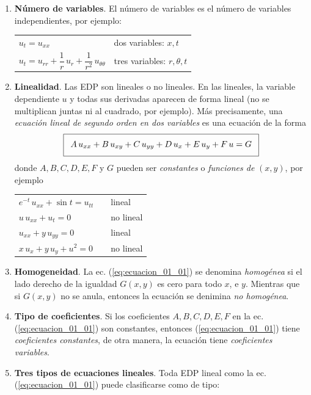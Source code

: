 \begin{enumerate}
\item \textbf{Número de variables}. El número de variables es el número de variables independientes, por ejemplo:
\begin{table}[H]
\centering
\large
\begin{tabular}{l l}
\large{$u_{t} = u_{xx}$} & dos variables: $x, t$ \\
\large{$u_{t} = u_{rr} + \dfrac{1}{r} \, u_{r} + \dfrac{1}{r^{2}} \, u_{\theta \theta}$} & tres variables: $r, \theta, t$
\end{tabular}
\end{table}
\item \textbf{Linealidad}. Las EDP son lineales o no lineales. En las lineales, la variable dependiente $u$ y todas sus derivadas aparecen de forma lineal (no se multiplican juntas ni al cuadrado, por ejemplo). Más precisamente, una \emph{ecuación lineal de segundo orden en dos variables} es una ecuación de la forma
\begin{align}
\addtolength{\fboxsep}{5pt}\boxed{ A \, u_{xx} + B \, u_{xy} + C \, u_{yy} + D \, u_{x} + E \, u_{y} + F \, u = G}
\label{eq:ecuacion_01_01}
\end{align}
donde $A, B, C, D, E, F$ y $G$ pueden ser \emph{constantes} o \emph{funciones de} $(x, y)$, por ejemplo
\begin{table}[H]
\centering
\large
\begin{tabular}{l p{1cm} l}
\large{$e^{-t} \, u_{xx} + \sin t = u_{tt}$} & & lineal \\
\large{$u \, u_{xx} + u_{t} = 0$} & & no lineal \\
\large{$u_{xx} + y \, u_{yy} = 0$} & & lineal \\
\large{$x \, u_{x} + y \, u_{y} + u^{2} = 0$} & & no lineal
\end{tabular}
\end{table}
\item \textbf{Homogeneidad}. La ec. (\ref{eq:ecuacion_01_01}) se denomina \emph{homogénea} si el lado derecho de la igualdad $G(x, y)$ es cero para todo $x$, e $y$. Mientras que si $G(x, y)$ no se anula, entonces la ecuación se denimina \emph{no homogénea}.
\item \textbf{Tipo de coeficientes}. Si los coeficientes $A, B, C, D, E, F$ en la ec. (\ref{eq:ecuacion_01_01}) son constantes, entonces (\ref{eq:ecuacion_01_01}) tiene \emph{coeficientes constantes}, de otra manera, la ecuación tiene \emph{coeficientes variables}.
\item \textbf{Tres tipos de ecuaciones lineales}. Toda EDP lineal como la ec. (\ref{eq:ecuacion_01_01}) puede clasificarse como de tipo:

\end{enumerate}
